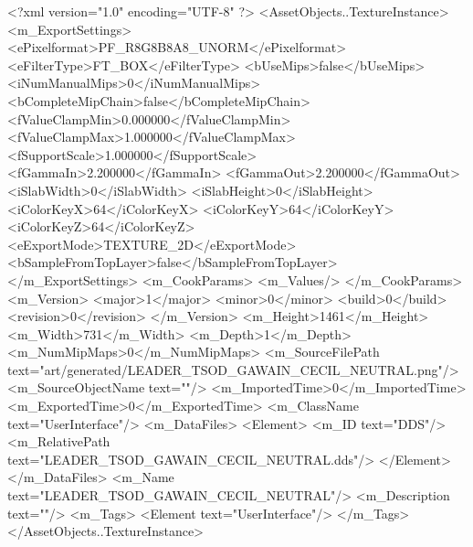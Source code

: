 <?xml version="1.0" encoding="UTF-8" ?>
<AssetObjects..TextureInstance>
	<m_ExportSettings>
		<ePixelformat>PF_R8G8B8A8_UNORM</ePixelformat>
		<eFilterType>FT_BOX</eFilterType>
		<bUseMips>false</bUseMips>
		<iNumManualMips>0</iNumManualMips>
		<bCompleteMipChain>false</bCompleteMipChain>
		<fValueClampMin>0.000000</fValueClampMin>
		<fValueClampMax>1.000000</fValueClampMax>
		<fSupportScale>1.000000</fSupportScale>
		<fGammaIn>2.200000</fGammaIn>
		<fGammaOut>2.200000</fGammaOut>
		<iSlabWidth>0</iSlabWidth>
		<iSlabHeight>0</iSlabHeight>
		<iColorKeyX>64</iColorKeyX>
		<iColorKeyY>64</iColorKeyY>
		<iColorKeyZ>64</iColorKeyZ>
		<eExportMode>TEXTURE_2D</eExportMode>
		<bSampleFromTopLayer>false</bSampleFromTopLayer>
	</m_ExportSettings>
	<m_CookParams>
		<m_Values/>
	</m_CookParams>
	<m_Version>
		<major>1</major>
		<minor>0</minor>
		<build>0</build>
		<revision>0</revision>
	</m_Version>
	<m_Height>1461</m_Height>
	<m_Width>731</m_Width>
	<m_Depth>1</m_Depth>
	<m_NumMipMaps>0</m_NumMipMaps>
	<m_SourceFilePath text="art/generated/LEADER_TSOD_GAWAIN_CECIL_NEUTRAL.png"/>
	<m_SourceObjectName text=""/>
	<m_ImportedTime>0</m_ImportedTime>
	<m_ExportedTime>0</m_ExportedTime>
	<m_ClassName text="UserInterface"/>
	<m_DataFiles>
		<Element>
			<m_ID text="DDS"/>
			<m_RelativePath text="LEADER_TSOD_GAWAIN_CECIL_NEUTRAL.dds"/>
		</Element>
	</m_DataFiles>
	<m_Name text="LEADER_TSOD_GAWAIN_CECIL_NEUTRAL"/>
	<m_Description text=""/>
	<m_Tags>
		<Element text="UserInterface"/>
	</m_Tags>
</AssetObjects..TextureInstance>
